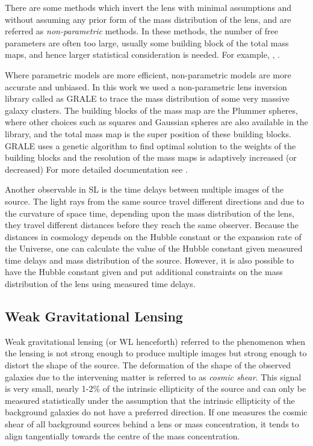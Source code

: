 There are some methods which invert the lens with minimal assumptions and without
assuming any prior form of the mass distribution of the lens, and are referred as
{\it non-parametric} methods. In these methods, the number of free parameters are often
too large, usually some building block of the total mass maps, and hence larger
statistical consideration is needed. For example, \cite{}, \cite{}.

Where parametric models are more efficient, non-parametric models are more
accurate and unbiased. In this work we used a non-parametric lens inversion
library called as GRALE \cite{} to trace the mass distribution of some very massive
galaxy clusters. The building blocks of the mass map are the Plummer spheres, where
other choices such as squares and Gaussian spheres are also available in the library, 
and the total mass map is the super position of these building blocks. GRALE uses
a genetic algorithm \citep{} to find optimal solution to the weights of the building 
blocks and the resolution of the mass maps is adaptively increased (or decreased)
For more detailed documentation see \cite{}.

Another observable in SL is the time delays between multiple images
of the source. The light rays from the same source travel different directions
and due to the curvature of space time, depending upon the mass distribution 
of the lens, they travel different distances before they reach the same 
observer. Because the distances in cosmology depends on the Hubble constant
or the expansion rate of the Universe, one can calculate the value of the
Hubble constant given measured time delays and mass distribution of the source. 
However, it is also possible to have the Hubble constant given and put
additional constraints on the mass distribution of the lens using measured
time delays. 


\subsection{Weak Gravitational Lensing}\label{sec:wl}

Weak gravitational lensing (or WL henceforth) referred to the phenomenon when 
the lensing is not strong enough to produce multiple images but strong enough
to distort the shape of the source. The deformation of the shape of the observed galaxies
due to the intervening matter is referred to as {\it cosmic shear}. This
signal is very small, nearly 1-2$\%$ of the intrinsic ellipticity of the source 
and can only be measured statistically under the assumption that the intrinsic 
ellipticity of the background galaxies do not have a preferred direction. If one 
measures the cosmic shear of all background sources behind a lens or mass concentration,
it tends to align tangentially towards the centre of the mass concentration. 

